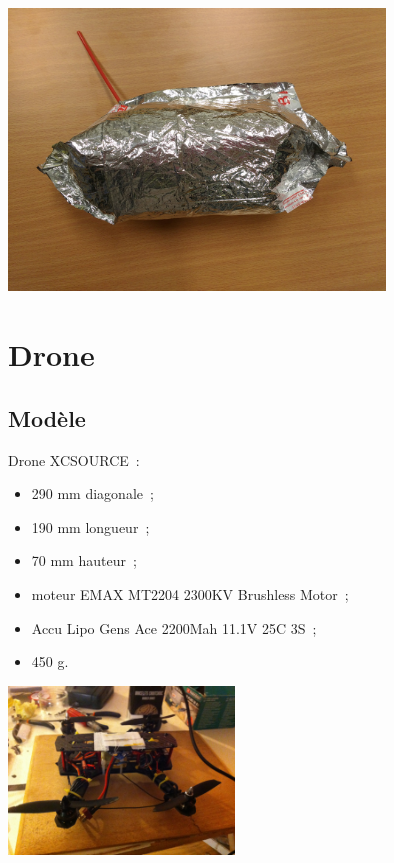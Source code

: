 \documentclass{beamer}
\begin{document}
\begin{frame}
  \begin{center}
    \includegraphics[width=10cm]{../Images/ballon3.jpg}
  \end{center}
\end{frame}

\section{Drone}

\subsection{Modèle}

\begin{frame}
  \begin{multicols}{2}
    Drone XCSOURCE~: \\
    \begin{itemize}
      \item 290 mm diagonale~;
      \item 190 mm longueur~;
      \item 70 mm hauteur~;
      \item moteur EMAX MT2204 2300KV Brushless Motor~;
      \item Accu Lipo Gens Ace 2200Mah 11.1V 25C 3S~;
      \item 450 g.
    \end{itemize}
    \newpage
    \begin{center}
      \includegraphics[width=6cm]{../Images/drone.JPG}
    \end{center}
  \end{multicols}
\end{frame}
\end{document}
